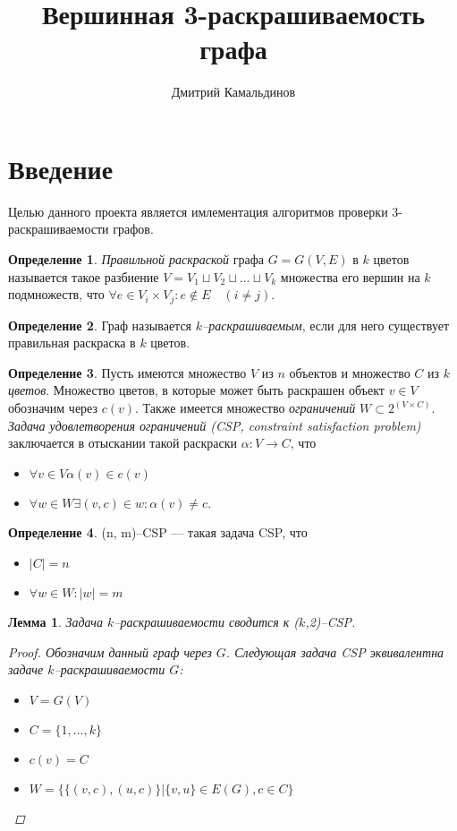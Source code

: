 \documentclass[fleqn]{article}
\author{Дмитрий Камальдинов}
\date{}
\title{Вершинная 3-раскрашиваемость графа}
\theoremstyle{plain}
\theoremstyle{plain}
\theoremstyle{plain}
\newtheorem{lemma}{Лемма}
\theoremstyle{definition}
\newtheorem{defin}{Определение}
\begin{document}
\maketitle

\section{Введение}
Целью данного проекта является имлементация алгоритмов проверки 3-раскрашиваемости графов.

\begin{defin}
	\emph{Правильной раскраской} графа $G = G(V,E)$ в $k$ цветов называется такое разбиение 
	$V = V_1 \sqcup V_2 \sqcup \dots \sqcup V_k$ множества его вершин на $k$ подмножеств, что 
	$\forall e \in V_i \times V_j : e \not\in E \quad (i \not= j)$.
\end{defin}

\begin{defin}
	Граф называется \emph{$k$--раскрашиваемым}, если для него существует правильная раскраска в $k$ цветов.
\end{defin}

\begin{defin} Пусть имеются множество $V$ из $n$ объектов и 
множество $C$ из $k$ \emph{цветов}. Множество цветов, в которые может быть раскрашен объект $v \in V$ обозначим через $c(v)$. Также имеется множество \emph{ограничений} $W \subset 2^{(V \times C)}$. \emph{Задача удовлетворения ограничений (CSP, constraint satisfaction problem)} заключается в отыскании такой раскраски $\alpha : V \rightarrow C$, что
\begin{itemize}
	\item $\forall v \in V \alpha(v) \in c(v)$
	\item $\forall w \in W \exists (v, c) \in w : \alpha(v) \not= c $.
\end{itemize}
\end{defin}

\begin{defin}
	(n, m)--CSP --- такая задача CSP, что
	\begin{itemize}
		\item $|C| = n$
		\item $\forall w \in W : |w| = m$
	\end{itemize}
\end{defin}

\begin{lemma}
	Задача $k$--раскрашиваемости сводится к ($k$,2)--CSP.
	\begin{proof}
		Обозначим данный граф через $G$. Следующая задача CSP эквивалентна задаче $k$--раскрашиваемости $G$:
		\begin{itemize}
			\item $V = G(V)$
			\item $C = \{1, \dots, k\}$
			\item $c(v) = C$
			\item $W = \{\{(v, c), (u, c)\} | \{v, u\} \in E(G), c \in C\}$
		\end{itemize}
	\end{proof}
\end{lemma}
\end{document}
